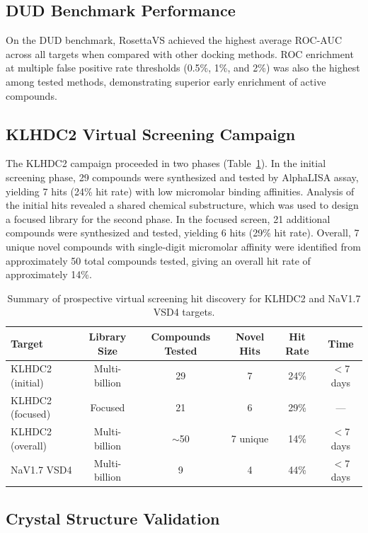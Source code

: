 \documentclass[12pt]{article}
\begin{document}
\subsection{DUD Benchmark Performance}

On the DUD benchmark, RosettaVS achieved the highest average ROC-AUC across all targets when compared with other docking methods. ROC enrichment at multiple false positive rate thresholds (0.5\%, 1\%, and 2\%) was also the highest among tested methods, demonstrating superior early enrichment of active compounds.

\subsection{KLHDC2 Virtual Screening Campaign}

The KLHDC2 campaign proceeded in two phases (Table~\ref{tab:hits}). In the initial screening phase, 29 compounds were synthesized and tested by AlphaLISA assay, yielding 7 hits (24\% hit rate) with low micromolar binding affinities. Analysis of the initial hits revealed a shared chemical substructure, which was used to design a focused library for the second phase. In the focused screen, 21 additional compounds were synthesized and tested, yielding 6 hits (29\% hit rate). Overall, 7 unique novel compounds with single-digit micromolar affinity were identified from approximately 50 total compounds tested, giving an overall hit rate of approximately 14\%.

\begin{table}[ht]
\centering
\caption{Summary of prospective virtual screening hit discovery for KLHDC2 and NaV1.7 VSD4 targets.}
\label{tab:hits}
\begin{tabular}{lccccc}
\toprule
\textbf{Target} & \textbf{Library Size} & \textbf{Compounds Tested} & \textbf{Novel Hits} & \textbf{Hit Rate} & \textbf{Time} \\
\midrule
KLHDC2 (initial) & Multi-billion & 29 & 7 & 24\% & $<$7 days \\
KLHDC2 (focused) & Focused & 21 & 6 & 29\% & --- \\
KLHDC2 (overall) & Multi-billion & $\sim$50 & 7 unique & 14\% & $<$7 days \\
NaV1.7 VSD4 & Multi-billion & 9 & 4 & 44\% & $<$7 days \\
\bottomrule
\end{tabular}
\end{table}

\subsection{Crystal Structure Validation}
\end{document}
